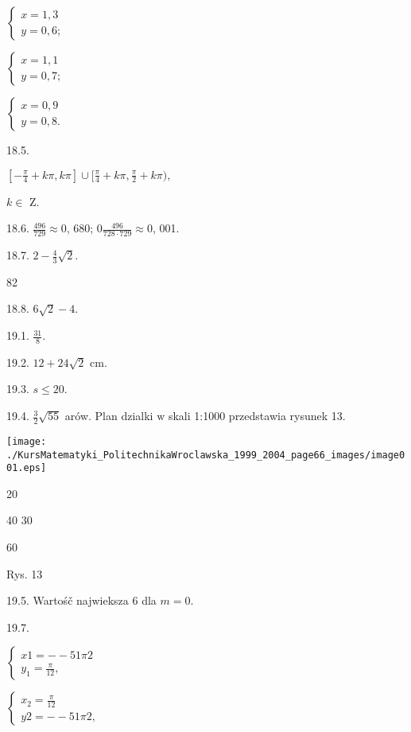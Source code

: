 \documentclass[a4paper,12pt]{article}
\begin{document}
$\left\{\begin{array}{l}
x=1,3\\
y=0,6;
\end{array}\right.$

$\left\{\begin{array}{l}
x=1,1\\
y=0,7;
\end{array}\right.$

$\left\{\begin{array}{l}
x=0,9\\
y=0,8.
\end{array}\right.$

18.5.

$[-\displaystyle \frac{\pi}{4}+k\pi,k\pi]\cup[\frac{\pi}{4}+k\pi,\frac{\pi}{2}+k\pi),$

$ k\in$ Z.

18.6. $\displaystyle \frac{496}{729}\approx 0$, 680; $0 \displaystyle \frac{496}{728\cdot 729}\approx 0$, 001.

18.7. $2-\displaystyle \frac{4}{3}\sqrt{2}.$





82

18.8. $6\sqrt{2}-4.$

19.1. $\displaystyle \frac{31}{8}.$

19.2. $12+24\sqrt{2}$ cm.

19.3. $s\leq 20.$

19.4. $\displaystyle \frac{3}{2}\sqrt{55}$ arów. Plan dzialki $\mathrm{w}$ skali 1:1000 przedstawia rysunek 13.
\begin{center}
\texttt{[image: ./KursMatematyki\_PolitechnikaWroclawska\_1999\_2004\_page66\_images/image001.eps]}
\end{center}
20

40  30

60

Rys. 13

19.5. Wartośč najwieksza 6 dla $m=0.$

19.7.

$\left\{\begin{array}{l}
x1=-- 51\pi 2\\
y_{1}=\frac{\pi}{12},
\end{array}\right.$

$\left\{\begin{array}{l}
x_{2}=\frac{\pi}{12}\\
y2=-- 51\pi 2,
\end{array}\right.$
\end{document}
